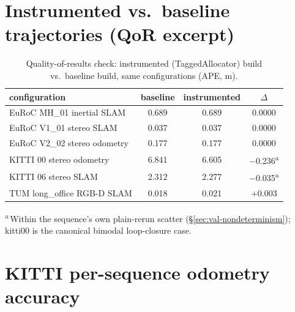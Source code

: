\section{Instrumented vs.\ baseline trajectories (QoR excerpt)}

\begin{table}[h]
\centering
\caption{Quality-of-results check: instrumented (TaggedAllocator) build vs.\
baseline build, same configurations (APE, m).}
\label{tab:qor}
\begin{tabular}{@{}lccc@{}}
\toprule
configuration & baseline & instrumented & $\Delta$ \\
\midrule
EuRoC MH\_01 inertial SLAM & 0.689 & 0.689 & 0.0000 \\
EuRoC V1\_01 stereo SLAM & 0.037 & 0.037 & 0.0000 \\
EuRoC V2\_02 stereo odometry & 0.177 & 0.177 & 0.0000 \\
KITTI 00 stereo odometry & 6.841 & 6.605 & $-$0.236\textsuperscript{a} \\
KITTI 06 stereo SLAM & 2.312 & 2.277 & $-$0.035\textsuperscript{a} \\
TUM long\_office RGB-D SLAM & 0.018 & 0.021 & $+$0.003 \\
\bottomrule
\end{tabular}

\smallskip
\raggedright\footnotesize \textsuperscript{a}\,Within the sequence's own
plain-rerun scatter (\S\ref{sec:val-nondeterminism}); kitti00 is the
canonical bimodal loop-closure case.
\end{table}

\section{KITTI per-sequence odometry accuracy}


